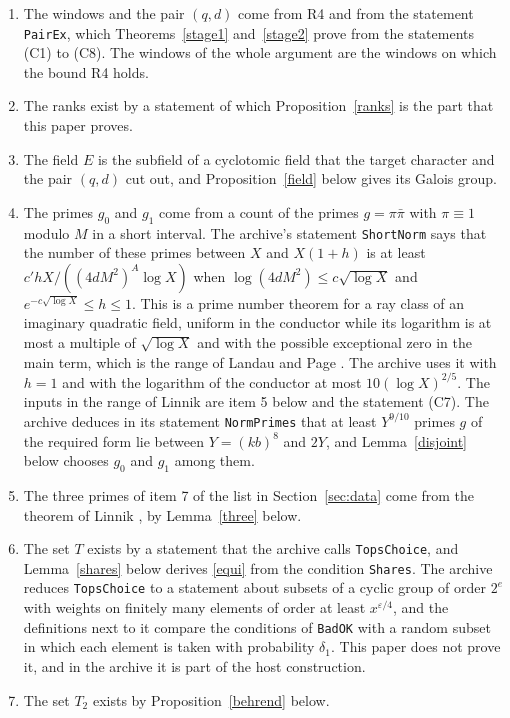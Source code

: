 \documentclass[11pt,letterpaper]{article}
\numberwithin{equation}{section}
\begin{document}
\begin{enumerate}
\item The windows and the pair $(q,d)$ come from R4 and from the statement \texttt{PairEx}, which Theorems~\ref{stage1} and~\ref{stage2} prove from the statements (C1) to (C8). The windows of the whole argument are the windows on which the bound R4 holds.
\item The ranks exist by a statement of which Proposition~\ref{ranks} is the part that this paper proves.
\item The field $E$ is the subfield of a cyclotomic field that the target character and the pair $(q,d)$ cut out, and Proposition~\ref{field} below gives its Galois group.
\item The primes $g_0$ and $g_1$ come from a count of the primes $g=\pi\bar\pi$ with $\pi\equiv1$ modulo $M$ in a short interval. The archive's statement \texttt{ShortNorm} says that the number of these primes between $X$ and $X(1+h)$ is at least $c'hX/((4dM^2)^A\log X)$ when $\log(4dM^2)\le c\sqrt{\log X}$ and $e^{-c\sqrt{\log X}}\le h\le1$. This is a prime number theorem for a ray class of an imaginary quadratic field, uniform in the conductor while its logarithm is at most a multiple of $\sqrt{\log X}$ and with the possible exceptional zero in the main term, which is the range of Landau and Page \cite{page}. The archive uses it with $h=1$ and with the logarithm of the conductor at most $10(\log X)^{2/5}$. The inputs in the range of Linnik are item 5 below and the statement (C7). The archive deduces in its statement \texttt{NormPrimes} that at least $Y^{9/10}$ primes $g$ of the required form lie between $Y=(kb)^8$ and $2Y$, and Lemma~\ref{disjoint} below chooses $g_0$ and $g_1$ among them.
\item The three primes of item 7 of the list in Section~\ref{sec:data} come from the theorem of Linnik \cite{linnik}, by Lemma~\ref{three} below.
\item The set $T$ exists by a statement that the archive calls \texttt{TopsChoice}, and Lemma~\ref{shares} below derives \eqref{equi} from the condition \texttt{Shares}. The archive reduces \texttt{TopsChoice} to a statement about subsets of a cyclic group of order $2^e$ with weights on finitely many elements of order at least $x^{\varepsilon/4}$, and the definitions next to it compare the conditions of \texttt{BadOK} with a random subset in which each element is taken with probability $\delta_1$. This paper does not prove it, and in the archive it is part of the host construction.
\item The set $T_2$ exists by Proposition~\ref{behrend} below.
\end{enumerate}
\end{document}
